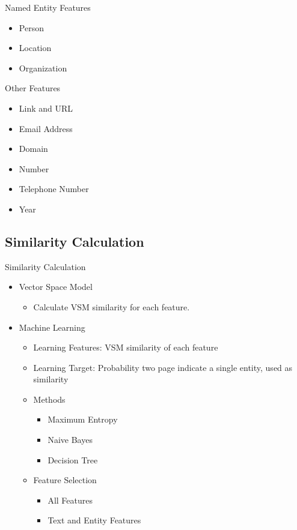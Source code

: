 \documentclass{beamer}
\begin{document}
\begin{frame}{Named Entity Features}
    \begin{itemize}
    \item Person 
    \item Location
    \item Organization
    \end{itemize}
\end{frame}

\begin{frame}{Other Features}
    \begin{itemize}
    \item Link and URL
    \item Email Address
    \item Domain
    \item Number
    \item Telephone Number
    \item Year
    \end{itemize}
\end{frame}

\subsection{Similarity Calculation}
\begin{frame}{Similarity Calculation}
    \begin{itemize}
    \item Vector Space Model
        \begin{itemize}
        \item Calculate VSM similarity for each feature.
        \end{itemize}
    \item Machine Learning
        \begin{itemize}
        \item Learning Features: VSM similarity of each feature
        \item Learning Target: Probability two page indicate a single entity, used as similarity
        \item Methods
            \begin{itemize}
            \item Maximum Entropy
            \item Naive Bayes
            \item Decision Tree
            \end{itemize}
        \item Feature Selection
            \begin{itemize}
            \item All Features
            \item Text and Entity Features
            \end{itemize}
        \end{itemize}
    \end{itemize}
\end{frame}
\end{document}
